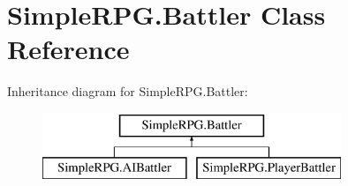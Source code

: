 \hypertarget{class_simple_r_p_g_1_1_battler}{\section{Simple\-R\-P\-G.\-Battler Class Reference}
\label{class_simple_r_p_g_1_1_battler}
}
Inheritance diagram for Simple\-R\-P\-G.\-Battler\-:\begin{figure}[H]
\begin{center}
\leavevmode
\includegraphics[height=2.000000cm]{class_simple_r_p_g_1_1_battler}
\end{center}
\end{figure}
